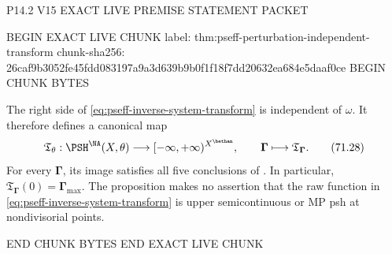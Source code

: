 P14.2 V15 EXACT LIVE PREMISE STATEMENT PACKET

BEGIN EXACT LIVE CHUNK
label: thm:pseff-perturbation-independent-transform
chunk-sha256: 26caf9b3052fe45fdd083197a9a3d639b9b0f1f18f7dd20632ea684e5daaf0ce
BEGIN CHUNK BYTES
\begin{proposition}\label{thm:pseff-perturbation-independent-transform}
The right side of \eqref{eq:pseff-inverse-system-transform} is independent
of \(\omega\).  It therefore defines a canonical map
\[
 \mathfrak T_\theta:
 \PSH^{\NA}(X,\theta)
 \longrightarrow[-\infty,+\infty)^{X^{\bethan}},
 \qquad
 \boldsymbol\Gamma\longmapsto
 \mathfrak T_{\boldsymbol\Gamma}.
\tag{71.28}\label{eq:pseff-canonical-transform-map}
\]
For every \(\boldsymbol\Gamma\), its image satisfies all five conclusions
of .  In particular,
\(\mathfrak T_{\boldsymbol\Gamma}(0)=\boldsymbol\Gamma_{\max}\).
The proposition makes no assertion that the raw function in
\eqref{eq:pseff-inverse-system-transform} is upper semicontinuous or MP
psh at nondivisorial points.
\end{proposition}
END CHUNK BYTES
END EXACT LIVE CHUNK
